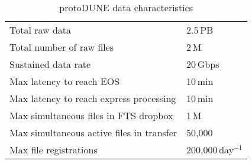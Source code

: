 \begin{table}[ht!]
	\centering
	\begin{tabular}{p{3.0in}p{0.95in}}
	\hline
	Total raw data & 2.5\,PB \\

	Total number of raw files & 2\,M \\

	Sustained data rate & 20\,Gbps \\

	Max latency to reach EOS & 10\,min \\

	Max latency to reach express processing & 10\,min\\

	Max simultaneous files in FTS dropbox & 1\,M\\

	Max simultaneous active files in transfer & 50,000\\

	Max file registrations & 200,000\,day$^{-1}$ \\


	\hline
\end{tabular}
\caption{protoDUNE data characteristics}
\label{tab:pdunedatachar}
\end{table}






